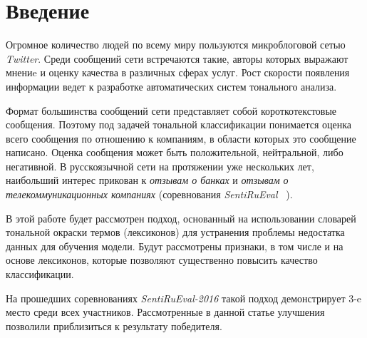 \section{Введение}
Огромное количество людей по всему миру пользуются микроблоговой сетью
{\it Twitter}.
Среди сообщений сети встречаются такие, авторы которых выражают мнениe и оценку
качества в различных сферах услуг.
Рост скорости появления информации ведет к разработке автоматических систем
тонального анализа.~\cite{tonalityAnalysis}

Формат большинства сообщений сети представляет собой короткотекстовые
сообщения. Поэтому под задачей тональной классификации понимается оценка всего
сообщения по отношению к компаниям, в области которых это сообщение написано.
Оценка сообщения может быть положительной, нейтральной, либо негативной.
В русскоязычной сети на протяжении уже нескольких лет, наибольший интерес прикован к
{\it отзывам о банках} и {\it отзывам о телекоммуникационных компаниях}
(соревнования {\it SentiRuEval} ~\cite{dialog2015,dialog2016}).

В этой работе будет рассмотрен подход, основанный на использовании
словарей тональной окраски термов (лексиконов) для устранения проблемы недостатка
данных для обучения модели.
Будут рассмотрены признаки, в том числе и на основе лексиконов, которые позволяют
существенно повысить качество классификации.

На прошедших соревнованиях {\it SentiRuEval-2016} такой подход демонстрирует
3-e место среди всех участников. Рассмотренные в данной статье улучшения
позволили приблизиться к результату победителя.
